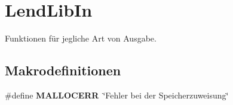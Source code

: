 \hypertarget{group___lend_lib_in}{}\section{Lend\+Lib\+In}
\label{group___lend_lib_in}


Funktionen für jegliche Art von Ausgabe.  


\subsection*{Makrodefinitionen}
\begin{DoxyCompactItemize}
\item 
\#define {\bfseries M\+A\+L\+L\+O\+C\+E\+RR}~\char`\"{}Fehler bei der Speicherzuweisung\char`\"{}\hypertarget{group___lend_lib_in_gafea163490cd0596e2677096aaf92a74f}{}\label{group___lend_lib_in_gafea163490cd0596e2677096aaf92a74f}

\end{DoxyCompactItemize}
